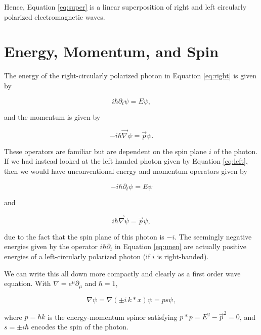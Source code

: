 \documentclass{birkjour}
\begin{document}
Hence, Equation \ref{eq:super} is a linear superposition of right and left circularly polarized electromagnetic waves.

\section{Energy, Momentum, and Spin}
\label{sec:qm}

The energy of the right-circularly polarized photon in Equation \ref{eq:right} is given by

\begin{equation} 
  i \hbar \partial_t \psi = E \psi, \label{eq:en}
\end{equation} 

and the momentum is given by 

\begin{equation}
  -i \hbar \vec \nabla \psi = \vec p \psi. \label{eq:mom}
\end{equation}

These operators are familiar but are dependent on the spin plane $i$ of the photon. If we had instead looked at the left handed photon given by Equation \ref{eq:left}, then we would have unconventional energy and momentum operators given by 

\begin{equation} 
  -i \hbar \partial_t \psi = E \psi \label{eq:unen}
\end{equation} 

and

\begin{equation}
  i \hbar \vec \nabla \psi = \vec p \psi, \label{eq:unmom}
\end{equation}

due to the fact that the spin plane of this photon is $-i$. The seemingly negative energies given by the operator $i \hbar \partial_t$ in Equation \ref{eq:unen} are actually positive energies of a left-circularly polarized photon (if $i$ is right-handed). 

We can write this all down more compactly and clearly as a first order wave equation. With $\nabla = e^\mu \partial_\mu$ and $\hbar = 1$,

\begin{equation}
  \nabla \psi = \nabla (\pm i \, k * x) \psi = p s \psi,\label{eq:mod}
\end{equation}

where $p = \hbar k$ is the energy-momentum spinor satisfying $p * p = E^2 - \vec p^2 = 0$, and $s = \pm i \hbar$ encodes the spin of the photon.
\end{document}
